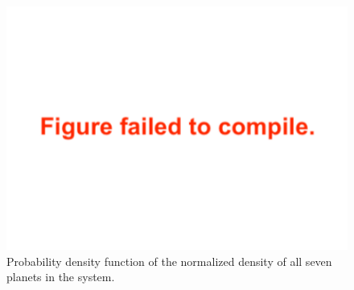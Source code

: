 \documentclass[twocolumn]{aastex63}
\begin{document}
\begin{figure}
    \centering
    \includegraphics[width=\hsize]{figures/plot_normalized_density_agol_et_al.pdf}
    {Probability density function of the normalized density of all seven planets in the system.
}
    \label{fig:norm_density_histo}
\end{figure}
\end{document}
